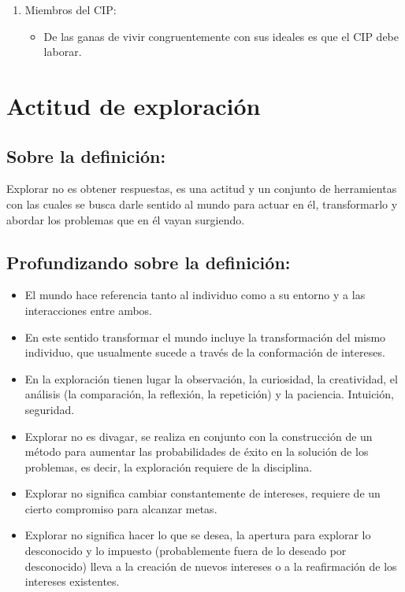 \documentclass[10pt,letterpaper,oneside]{book}
\begin{document}
\begin{enumerate}[label=\Alph*]
			\item Miembros del CIP:
			\begin{itemize}
			\item De las ganas de vivir congruentemente con sus ideales es que el CIP debe laborar.
			\end{itemize}
			\end{enumerate}


	\section{Actitud de exploración} 

\subsection*{Sobre la definición:}	
		Explorar no es obtener respuestas, es una actitud y un conjunto de herramientas con las cuales se busca darle sentido al mundo para actuar en él, transformarlo y abordar los problemas que en él vayan surgiendo.

		\subsection*{Profundizando sobre la definición:}
		\begin{itemize} 
		\item El mundo hace referencia tanto al individuo como a su entorno y a las interacciones entre ambos. 
		\item En este sentido transformar el mundo incluye la transformación del mismo individuo, que usualmente sucede a través de la conformación de intereses.

\item En la exploración tienen lugar la observación, la curiosidad, la creatividad, el análisis (la comparación, la reflexión, la repetición) y la paciencia. Intuición, seguridad.
\item Explorar no es divagar, se realiza en conjunto con la construcción de un método para aumentar las probabilidades de éxito en la solución de los problemas, es decir, la exploración requiere de la disciplina.
\item Explorar no significa cambiar constantemente de intereses, requiere de un cierto compromiso para alcanzar metas.
\item Explorar no significa hacer lo que se desea, la apertura para explorar lo desconocido y lo impuesto (probablemente fuera de lo deseado por desconocido) lleva a la creación de nuevos intereses o a la reafirmación de los intereses existentes.

\end{itemize}
\end{document}
